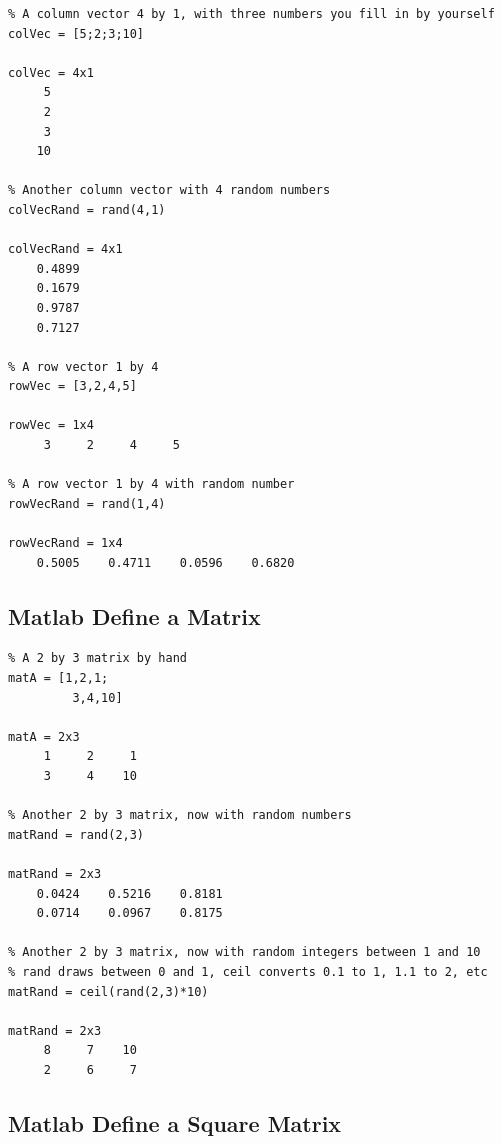 \documentclass[
]{book}
\begin{document}
\begin{verbatim}
% A column vector 4 by 1, with three numbers you fill in by yourself
colVec = [5;2;3;10]

colVec = 4x1    
     5
     2
     3
    10

% Another column vector with 4 random numbers
colVecRand = rand(4,1)

colVecRand = 4x1    
    0.4899
    0.1679
    0.9787
    0.7127

% A row vector 1 by 4
rowVec = [3,2,4,5]

rowVec = 1x4    
     3     2     4     5

% A row vector 1 by 4 with random number
rowVecRand = rand(1,4)

rowVecRand = 1x4    
    0.5005    0.4711    0.0596    0.6820
\end{verbatim}

\hypertarget{matlab-define-a-matrix}{%
\subsection{Matlab Define a Matrix}\label{matlab-define-a-matrix}}

\begin{verbatim}
% A 2 by 3 matrix by hand
matA = [1,2,1;
         3,4,10]

matA = 2x3    
     1     2     1
     3     4    10

% Another 2 by 3 matrix, now with random numbers
matRand = rand(2,3)

matRand = 2x3    
    0.0424    0.5216    0.8181
    0.0714    0.0967    0.8175

% Another 2 by 3 matrix, now with random integers between 1 and 10
% rand draws between 0 and 1, ceil converts 0.1 to 1, 1.1 to 2, etc
matRand = ceil(rand(2,3)*10)

matRand = 2x3    
     8     7    10
     2     6     7
\end{verbatim}

\hypertarget{matlab-define-a-square-matrix}{%
\subsection{Matlab Define a Square Matrix}\label{matlab-define-a-square-matrix}}
\end{document}
